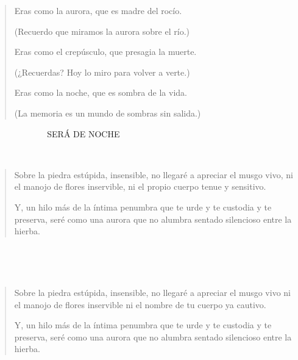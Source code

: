 \documentclass[a4paper, 12pt]{article}
\begin{document}
\pagebreak 

\begin{verse}
    Eras como la aurora,
    que es madre del rocío.

    (Recuerdo que miramos
    la aurora sobre el río.)

    Eras como el crepúsculo,
    que presagia la muerte.

    (¿Recuerdas? Hoy lo miro 
    para volver a verte.)

    Eras como la noche,
    que es sombra de la vida.

    (La memoria es un mundo 
    de sombras sin salida.)
\end{verse}


\pagebreak 

~ ~ ~ ~ ~ ~ ~ ~ SERÁ DE NOCHE

~ 


\begin{verse}
    Sobre la piedra estúpida, insensible,
    no llegaré a apreciar el musgo vivo,
    ni el manojo de flores inservible,
    ni el propio cuerpo tenue y sensitivo. 

    Y, un hilo más de la íntima penumbra 
    que te urde y te custodia y te preserva, 
    seré como una aurora que no alumbra 
    sentado silencioso entre la hierba.
\end{verse}

~ 

~

\begin{verse}
    Sobre la piedra estúpida, insensible,
    no llegaré a apreciar el musgo vivo
    ni el manojo de flores inservible
    ni el nombre de tu cuerpo ya cautivo.

    Y, un hilo más de la íntima penumbra 
    que te urde y te custodia y te preserva, 
    seré como una aurora que no alumbra 
    sentado silencioso entre la hierba.
\end{verse}


\pagebreak 
\end{document}
